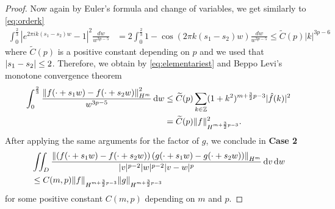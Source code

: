 \begin{proof}
	Now again by Euler's formula and change of variables, we get similarly to \eqref{eq:orderk}
	\begin{align*}
	\int_{0}^{\frac 23}  |e^{2\pi i k (s_1 -s_2)w}-1|^2 \frac{dw}{w^{3p-5}} & = 2 \int_{0}^{\frac 23}  1-\cos (2\pi  k (s_1 -s_2)w) \frac{dw}{w^{3p-5}} \leq \widetilde C(p) |k|^{3p-6}
	\end{align*}
    where $\widetilde C(p)$ is a positive constant depending on $p$ and we used that $\lvert s_1-s_2\rvert \le 2$.
	Therefore, we obtain by \eqref{eq:elementariest} and Beppo Levi's monotone convergence theorem
	\begin{align}\label{eq:case2}
	\int_{0}^{\frac 23}  \frac{ \left\| f(\cdot+s_1w) - f(\cdot+s_2w) \right\|^2_{H^m}}{w^{3p-5}}  \d w & \leq \widetilde C(p)  \sum_{k\in\Z} (1+k^2)^{m+\frac 32 p -3} |\hat{f}(k)|^2  \nonumber\\
	& = \widetilde C (p) \|f\|^2_{H^{m+\frac 32 p -3}}. 
	\end{align}
	After applying the same arguments for the factor of $g$, we conclude in \textbf{Case 2}
	\begin{align*}
	& \iint_D   \frac{ \left\| \left(f(\cdot+s_1w) - f(\cdot+s_2w) \right) \left(g(\cdot+s_1w) - g(\cdot+s_2w) \right) \right\|_{H^m}}{|v|^{p-2}|w|^{p-2}|v-w|^{p}}  \,\mathrm{d} v \,\mathrm{d} w \\
	& \leq C(m,p) \|f\|_{H^{m+\frac 32 p -3}} \|g\|_{H^{m+\frac 32 p -3}}
	\end{align*}
	for some positive constant $C(m,p)$ depending on $m$ and $p$.


\end{proof}
